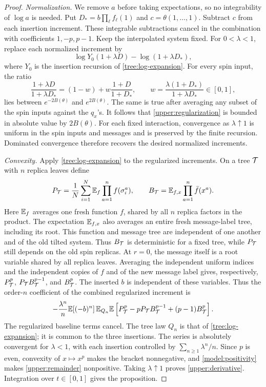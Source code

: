 \begin{proof}
\emph{Normalization.}
We remove $a$ before taking expectations, so no integrability of
$\log a$ is needed. Put
$D_*=b\prod_\ell f_\ell(1)$ and $c=\theta(1,\ldots,1)$.
Subtract $c$ from each insertion increment. These integrable subtractions
cancel in the combination with coefficients $1,-p,p-1$.
Keep the interpolated system fixed. For $0<\lambda<1$, replace
each normalized increment by
\begin{equation}\label{upper:regularization}
 \log Y_0(1+\lambda D)-\log(1+\lambda D_*),
\end{equation}
where $Y_0$ is the insertion recursion of \cref{tree:log-expansion}.
For every spin input, the ratio
\[
 \frac{1+\lambda D}{1+\lambda D_*}
 =(1-w)+w\frac{1+D}{1+D_*},
 \qquad w=\frac{\lambda(1+D_*)}{1+\lambda D_*}\in[0,1],
\]
lies between $e^{-2B(\theta)}$ and $e^{2B(\theta)}$. The same is true
after averaging any subset of the spin inputs against the $q_x$'s.
It follows that \eqref{upper:regularization} is bounded in absolute value by
$2B(\theta)$. For each fixed interaction, convergence as $\lambda\uparrow1$
is uniform in the spin inputs and messages and is preserved by the finite
recursion. Dominated convergence therefore recovers the desired normalized
increments.

\emph{Convexity.}
Apply \cref{tree:log-expansion} to the regularized increments. On a tree
$\mathcal T$ with $n$ replica leaves define
\[
 P_{\mathcal T}=\frac1N\sum_{i=1}^N\mathbb E_f\prod_{a=1}^n f(\sigma_i^a),\qquad
 B_{\mathcal T}=\mathbb E_{f,x}\prod_{a=1}^n\bar f(x^a).
\]
Here $\mathbb E_f$ averages one fresh function $f$, shared by all $n$ replica
factors in the product. The expectation $\mathbb E_{f,x}$ also averages an
entire fresh message-label tree, including its root. This function and
message tree are independent of one another and of the old tilted system.
Thus $B_{\mathcal T}$ is deterministic for a fixed tree, while $P_{\mathcal T}$ still
depends on the old spin replicas. At $r=0$, the message itself is a root
variable shared by all replica leaves. Averaging the
independent uniform indices and the independent copies of $f$ and of
the new message label gives, respectively,
$P_{\mathcal T}^p$, $P_{\mathcal T}B_{\mathcal T}^{p-1}$, and $B_{\mathcal T}^p$.
The inserted $b$ is independent of these variables. Thus the order-$n$
coefficient of the combined regularized increment is
\begin{equation}\label{upper:remainder}
 -\frac{\lambda^n}{n}\mathbb E[(-b)^n]\,
 \mathbb E_{Q_n}\mathbb E\left[
 P_{\mathcal T}^p-pP_{\mathcal T}B_{\mathcal T}^{p-1}+(p-1)B_{\mathcal T}^p\right].
\end{equation}
The regularized baseline terms cancel. The tree law $Q_n$ is that of
\cref{tree:log-expansion}; it is common to the three insertions.
The series is absolutely convergent for $\lambda<1$, with each insertion
controlled by $\sum_{n\ge1}\lambda^n/n$. Since $p$ is even,
convexity of $x\mapsto x^p$ makes the bracket nonnegative, and
\eqref{model:positivity} makes \eqref{upper:remainder} nonpositive.
Taking $\lambda\uparrow1$ proves \eqref{upper:derivative}. Integration over
$t\in[0,1]$ gives the proposition.
\end{proof}

